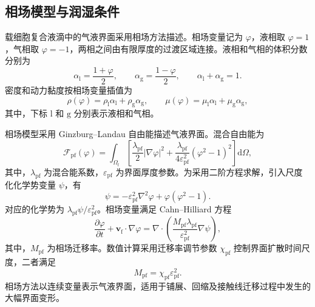 \subsection{相场模型与润湿条件}
\label{subsec:ch2_phase_field}

载细胞复合液滴中的气液界面采用相场方法描述。相场变量记为 $\varphi$，液相取 $\varphi=1$，气相取 $\varphi=-1$，两相之间由有限厚度的过渡区域连接。液相和气相的体积分数分别为
\begin{equation}
\alpha_{\mathrm l}=\frac{1+\varphi}{2},
\qquad
\alpha_{\mathrm g}=\frac{1-\varphi}{2},
\qquad
\alpha_{\mathrm l}+\alpha_{\mathrm g}=1.
\label{eq:ch2_phase_fraction}
\end{equation}
密度和动力黏度按相场变量插值为
\begin{equation}
\rho(\varphi)
=
\rho_{\mathrm l}\alpha_{\mathrm l}
+
\rho_{\mathrm g}\alpha_{\mathrm g},
\qquad
\mu(\varphi)
=
\mu_{\mathrm l}\alpha_{\mathrm l}
+
\mu_{\mathrm g}\alpha_{\mathrm g},
\label{eq:ch2_phase_properties}
\end{equation}
其中，下标 $\mathrm l$ 和 $\mathrm g$ 分别表示液相和气相。

相场模型采用 Ginzburg--Landau 自由能描述气液界面。混合自由能为
\begin{equation}
\mathcal{F}_{\mathrm{pf}}(\varphi)
=
\int_{\Omega_{\mathrm f}}
\left[
\frac{\lambda_{\mathrm{pf}}}{2}
\left|\nabla\varphi\right|^2
+
\frac{\lambda_{\mathrm{pf}}}{4\varepsilon_{\mathrm{pf}}^2}
\left(\varphi^2-1\right)^2
\right]
\mathrm d\Omega,
\label{eq:ch2_phase_free_energy}
\end{equation}
其中，$\lambda_{\mathrm{pf}}$ 为混合能系数，$\varepsilon_{\mathrm{pf}}$ 为界面厚度参数。为采用二阶方程求解，引入尺度化化学势变量 $\psi$，有
\begin{equation}
\psi
=
-\varepsilon_{\mathrm{pf}}^2\nabla^2\varphi
+
\varphi\left(\varphi^2-1\right).
\label{eq:ch2_phase_auxiliary}
\end{equation}
对应的化学势为 $\lambda_{\mathrm{pf}}\psi/\varepsilon_{\mathrm{pf}}^2$。相场变量满足 Cahn--Hilliard 方程
\begin{equation}
\frac{\partial\varphi}{\partial t}
+
\boldsymbol{v}_{\mathrm f}\cdot\nabla\varphi
=
\nabla\cdot
\left(%
\frac{M_{\mathrm{pf}}\lambda_{\mathrm{pf}}}
{\varepsilon_{\mathrm{pf}}^2}
\nabla\psi
\right),
\label{eq:ch2_cahn_hilliard}
\end{equation}
其中，$M_{\mathrm{pf}}$ 为相场迁移率。数值计算采用迁移率调节参数 $\chi_{\mathrm{pf}}$ 控制界面扩散时间尺度，二者满足
\begin{equation}
M_{\mathrm{pf}}
=
\chi_{\mathrm{pf}}\varepsilon_{\mathrm{pf}}^2.
\label{eq:ch2_phase_mobility}
\end{equation}
相场方法以连续变量表示气液界面，适用于铺展、回缩及接触线迁移过程中发生的大幅界面变形\cite{anderson1998diffuseinterface,jacqmin1999phasefield,badalassi2003phasefield,yue2004diffuseinterface}。

